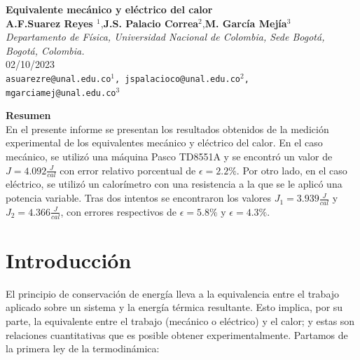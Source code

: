 \documentclass{article}
\date{}
\begin{document}
 
     \begin{center}
        {\Large \textbf{Equivalente mecánico y eléctrico del calor}}\\
        \vspace{5mm}
        {\small \textbf{A.F.Suarez Reyes $^{1}$},\textbf{J.S. Palacio Correa$^{2}$},\textbf{M. García Mejía$^{3}$} \\
        \vspace{3mm}}
        {\small \textit{Departamento de Física, Universidad Nacional de Colombia, Sede Bogotá, Bogotá, Colombia.}}\\
        \vspace{3mm}
        {\small 02/10/2023}\\
        \vspace{3mm}
        {\texttt{\textup{asuarezre@unal.edu.co$^{1}$, jspalacioco@unal.edu.co$^2$, mgarciamej@unal.edu.co$^{3}$}}} \\
    \end{center}
    
    
    \vspace{5mm}

{\large \textbf{Resumen}}\\
En el presente informe se presentan los resultados obtenidos de la medición experimental de los equivalentes mecánico y eléctrico del calor. En el caso mecánico, se utilizó una máquina Pasco TD8551A y se encontró un valor de $J = 4.092 \frac{J}{cal}$ con error relativo porcentual de $\epsilon = 2.2\%$. Por otro lado, en el caso eléctrico, se utilizó un calorímetro con una resistencia a la que se le aplicó una potencia variable. Tras dos intentos se encontraron los valores $J_1 = 3.939 \frac{J}{cal}$ y $J_2 = 4.366 \frac{J}{cal}$, con errores respectivos de $\epsilon = 5.8\%$ y $\epsilon = 4.3\%$.

\textit{ \hspace{2mm}}

\section{Introducción}
El principio de conservación de energía lleva a la equivalencia entre el trabajo aplicado sobre un sistema y la energía térmica resultante. Esto implica, por su parte, la equivalente entre el trabajo (mecánico o eléctrico) y el calor; y estas son relaciones cuantitativas que es posible obtener experimentalmente. Partamos de la primera ley de la termodinámica:
\end{document}

